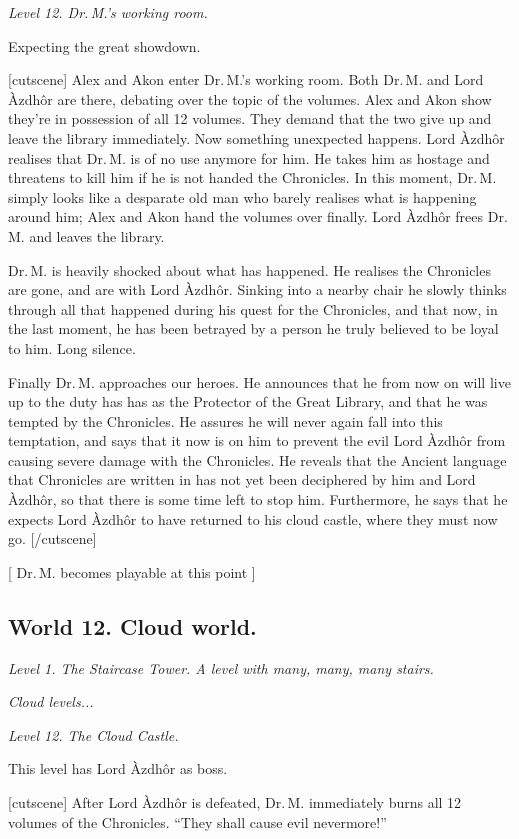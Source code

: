 \documentclass{gd-document}
\newcommand\DrM{Dr.\,M.\xspace}
\newcommand\Azdhor{Lord Àzdhôr\xspace}
\newcommand\level[1]{\textit{#1}}
\begin{document}
\level{Level 12. \DrM’s working room.}

Expecting the great showdown.

[cutscene]
Alex and Akon enter \DrM’s working room. Both \DrM and \Azdhor are
there, debating over the topic of the volumes. Alex and Akon show
they’re in possession of all 12 volumes. They demand that the two give
up and leave the library immediately. Now something unexpected
happens. \Azdhor realises that \DrM is of no use anymore for him. He
takes him as hostage and threatens to kill him if he is not handed the
Chronicles. In this moment, \DrM simply looks like a desparate old man
who barely realises what is happening around him; Alex and Akon hand
the volumes over finally. \Azdhor frees \DrM and leaves the library.

\DrM is heavily shocked about what has happened. He realises the
Chronicles are gone, and are with \Azdhor. Sinking into a nearby chair
he slowly thinks through all that happened during his quest for the
Chronicles, and that now, in the last moment, he has been betrayed by
a person he truly believed to be loyal to him. Long silence.

Finally \DrM approaches our heroes. He announces that he from now on
will live up to the duty has has as the Protector of the Great
Library, and that he was tempted by the Chronicles. He assures he will
never again fall into this temptation, and says that it now is on him
to prevent the evil \Azdhor from causing severe damage with the
Chronicles. He reveals that the Ancient language that Chronicles are
written in has not yet been deciphered by him and \Azdhor, so that
there is some time left to stop him. Furthermore, he says that he
expects \Azdhor to have returned to his cloud castle, where they must
now go.
[/cutscene]

[ \DrM becomes playable at this point ]

\subsection{World 12. Cloud world.}

\level{Level 1. The Staircase Tower. A level with many, many, many
  stairs.}

\level{Cloud levels...}

\level{Level 12. The Cloud Castle.}

This level has \Azdhor as boss.

[cutscene]
After \Azdhor is defeated, \DrM immediately burns all 12 volumes of
the Chronicles. “They shall cause evil nevermore!”
\end{document}
